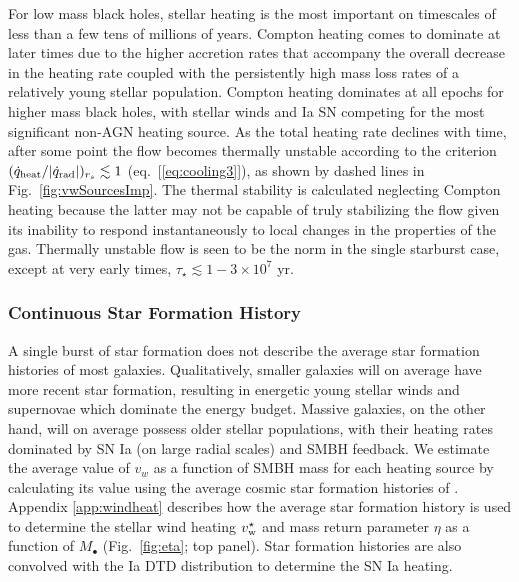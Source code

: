 \documentclass[usenatbib,fleqn]{mn2e}
\newcommand{\vwO}{v_{w}}
\begin{document}
For low mass black holes, stellar heating is the most important on timescales of less than a few tens of millions of years.  Compton heating comes to dominate at later times due to the higher accretion rates that accompany the overall decrease in the heating rate coupled with the persistently high mass loss rates of a relatively young stellar population.  Compton heating dominates at all epochs for higher mass black holes, with stellar winds and Ia SN competing for the most significant non-AGN heating source.  As the total heating rate declines with time, after some point the flow becomes thermally unstable according to the criterion $(\dot{q}_{\rm heat}/|\dot{q}_{\rm rad}|)_{r_{s}} \lesssim 1$ (eq.~[\ref{eq:cooling3}]), as shown by dashed lines in Fig.~\ref{fig:vwSourcesImp}.  The thermal stability is calculated neglecting Compton heating because the latter may not be capable of truly stabilizing the flow given its inability to respond instantaneously to local changes in the properties of the gas.  Thermally unstable flow is seen to be the norm in the single starburst case, except at very early times, $\tau_{\star} \lesssim 1-3 \times 10^7$ yr.

\subsubsection{Continuous Star Formation History}

A single burst of star formation does not describe the average star formation histories of most galaxies.  Qualitatively,
smaller galaxies will on average have more recent star formation, resulting in energetic young stellar winds and supernovae which dominate the energy budget.  Massive galaxies, on the other hand, will on average possess older stellar populations, with their heating rates dominated by SN Ia (on large radial scales) and SMBH feedback.  We estimate the average value of $\vwO$ as a function of SMBH mass for each heating source by calculating its value using the average cosmic star formation histories of \citet{MosterNaab+:2013a}.  Appendix \ref{app:windheat} describes how the average star formation history is used to determine the stellar wind heating $v_{\rm  w}^{\star}$ and mass return parameter $\eta$ as a function of $M_{\bullet}$ (Fig.~\ref{fig:eta}; top panel).  Star formation histories are also convolved with the Ia DTD distribution to determine the SN Ia heating.  
\end{document}

